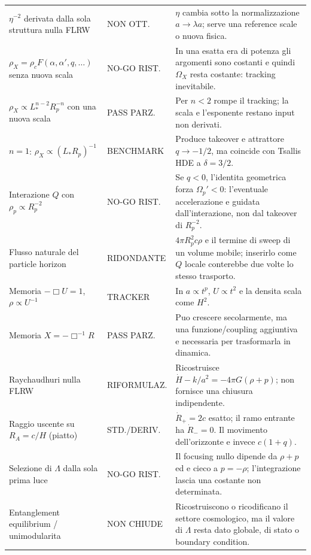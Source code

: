 \documentclass[11pt,a4paper]{article}
\newcommand{\status}[1]{\textsf{#1}}
\begin{document}
\begin{longtable}{p{}p{}p{}}
\addlinespace
$\eta^{-2}$ derivata dalla sola struttura nulla FLRW & \status{NON OTT.} & $\eta$ cambia sotto la normalizzazione $a\to\lambda a$; serve una reference scale o nuova fisica. \\
\addlinespace
$\rho_X=\rho_cF(\alpha,\alpha',q,\ldots)$ senza nuova scala & \status{NO-GO RIST.} & In una esatta era di potenza gli argomenti sono costanti e quindi $\Omega_X$ resta costante: tracking inevitabile. \\
\addlinespace
$\rho_X\propto L_*^{n-2}R_p^{-n}$ con una nuova scala & \status{PASS PARZ.} & Per $n<2$ rompe il tracking; la scala e l'esponente restano input non derivati. \\
\addlinespace
$n=1$: $\rho_X\propto(L_*R_p)^{-1}$ & \status{BENCHMARK} & Produce takeover e attrattore $q\to-1/2$, ma coincide con Tsallis HDE a $\delta=3/2$. \\
\addlinespace
Interazione $Q$ con $\rho_p\propto R_p^{-2}$ & \status{NO-GO RIST.} & Se $q<0$, l'identita geometrica forza $\Omega_p'<0$: l'eventuale accelerazione e guidata dall'interazione, non dal takeover di $R_p^{-2}$. \\
\addlinespace
Flusso naturale del particle horizon & \status{RIDONDANTE} & $4\pi R_p^2c\rho$ e il termine di sweep di un volume mobile; inserirlo come $Q$ locale conterebbe due volte lo stesso trasporto. \\
\addlinespace
Memoria $-\Box U=1$, $\rho\propto U^{-1}$ & \status{TRACKER} & In $a\propto t^p$, $U\propto t^2$ e la densita scala come $H^2$. \\
\addlinespace
Memoria $X=-\Box^{-1}R$ & \status{PASS PARZ.} & Puo crescere secolarmente, ma una funzione/coupling aggiuntiva e necessaria per trasformarla in dinamica. \\
\addlinespace
Raychaudhuri nulla FLRW & \status{RIFORMULAZ.} & Ricostruisce $\dot H-k/a^2=-4\pi G(\rho+p)$; non fornisce una chiusura indipendente. \\
\addlinespace
Raggio uscente su $R_A=c/H$ (piatto) & \status{STD./DERIV.} & $\dot R_+=2c$ esatto; il ramo entrante ha $\dot R_-=0$. Il movimento dell'orizzonte e invece $c(1+q)$. \\
\addlinespace
Selezione di $\Lambda$ dalla sola prima luce & \status{NO-GO RIST.} & Il focusing nullo dipende da $\rho+p$ ed e cieco a $p=-\rho$; l'integrazione lascia una costante non determinata. \\
\addlinespace
Entanglement equilibrium / unimodularita & \status{NON CHIUDE} & Ricostruiscono o ricodificano il settore cosmologico, ma il valore di $\Lambda$ resta dato globale, di stato o boundary condition. \\

\end{longtable}
\end{document}
